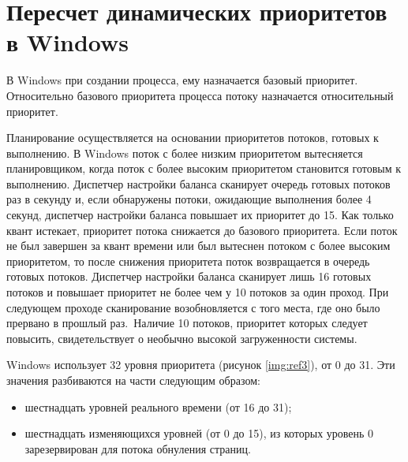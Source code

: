 \documentclass[a4paper,oneside,14pt]{extreport}
\begin{document}
\section*{Пересчет динамических приоритетов в Windows}

В Windows при создании процесса, ему назначается базовый приоритет.
Относительно базового приоритета процесса потоку назначается относительный приоритет.

Планирование осуществляется на основании приоритетов потоков, готовых к выполнению.
В Windows поток с более низким приоритетом вытесняется планировщиком, когда поток 
с более высоким приоритетом становится готовым к выполнению.
Диспетчер настройки баланса сканирует очередь готовых потоков раз в секунду и,
если обнаружены потоки, ожидающие выполнения более 4
секунд, диспетчер настройки баланса повышает их приоритет до 15. 
Как только квант истекает, приоритет потока снижается до базового приоритета.
Если поток не был завершен за квант времени или был вытеснен потоком с более высоким приоритетом, то после снижения приоритета поток
возвращается в очередь готовых потоков. 
Диспетчер настройки баланса сканирует лишь 16 готовых потоков
и повышает приоритет не более чем у 10 потоков за один проход.
При следующем проходе сканирование возобновляется
с того места, где оно было прервано в прошлый раз.\
Наличие 10 потоков, приоритет которых следует повысить,
свидетельствует о необычно высокой загруженности системы.

Windows использует 32 уровня приоритета (рисунок \ref{img:ref3}), от 0 до 31. Эти значения
разбиваются на части следующим образом:

\begin{itemize}
	\item шестнадцать уровней реального времени (от 16 до 31);
	\item шестнадцать изменяющихся уровней (от 0 до 15), из которых
	уровень 0 зарезервирован для потока обнуления страниц.
\end{itemize}


\begin{figure}[ht!]
\end{figure}
\end{document}
